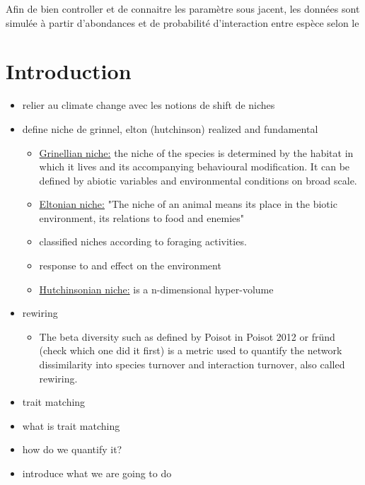 \documentclass{article}
\begin{document}
Afin de bien controller et de connaitre les paramètre sous jacent, les données sont simulée à partir d'abondances et de probabilité d'interaction entre espèce selon le  

\section{Introduction}




\begin{itemize}
    \item relier au climate change avec les notions de shift de niches
    \item define niche de grinnel, elton (hutchinson) realized and fundamental
    \begin{itemize}
        \item \underline{Grinellian niche:} the niche of the species is determined by the habitat in which it lives and its accompanying behavioural modification. It can be defined by abiotic variables and environmental conditions on broad scale.
        \item \underline{Eltonian niche:} "The niche of an animal means its place in the biotic environment, its relations to food and enemies"
        \item classified niches according to foraging activities.
        \item response to and effect on the environment
        \item \underline{Hutchinsonian niche:} is a n-dimensional hyper-volume
    \end{itemize}
    \item rewiring
    \begin{itemize}
        \item The beta diversity such as defined by Poisot in Poisot 2012 or fründ (check which one did it first) is a metric used to quantify the network  dissimilarity into species turnover and interaction turnover, also called rewiring.
    \end{itemize}
    \item trait matching
        \item what is trait matching
        \item how do we quantify it?
    \item introduce what we are going to do
\end{itemize}
\end{document}
